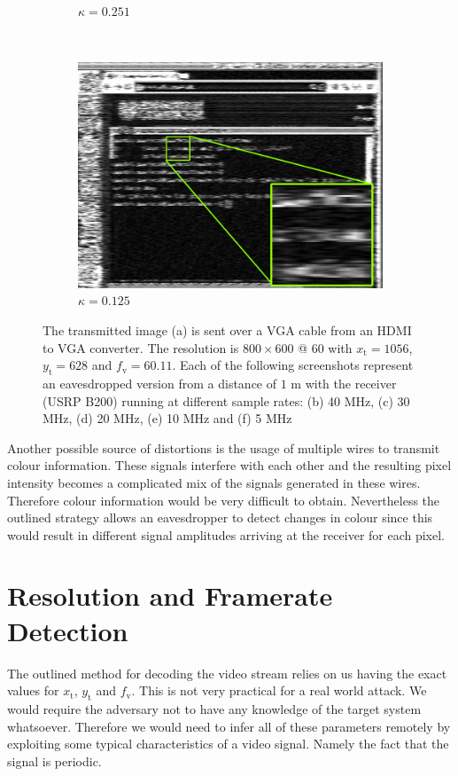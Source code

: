\documentclass[a4paper,12pt,twoside,openright]{report}
\begin{document}
\begin{figure}[p!]
\begin{subfigure}[b]{0.45\textwidth}
  \caption{$\kappa = 0.251$}
\end{subfigure} ~
\begin{subfigure}[b]{0.45\textwidth}
  \includegraphics[width=\textwidth]{sr_5MHz_at_190MHz}
  \caption{$\kappa = 0.125$}
\end{subfigure}
\caption{The transmitted image (a) is sent over a VGA cable from an HDMI to VGA converter. The resolution is $800 \times 600 $ @ $ 60$ with $x_\text{t} = 1056$, $y_\text{t} = 628$ and $f_\text{v} = 60.11$. Each of the following screenshots represent an eavesdropped version from a distance of $1$ m with the receiver (USRP B200) running at different sample rates: (b) 40 MHz, (c) 30 MHz, (d) 20 MHz, (e) 10 MHz and (f) 5 MHz}
\label{fig:samplerates}
\end{figure}

Another possible source of distortions is the usage of multiple wires to transmit colour information. These signals interfere with each other and the resulting pixel intensity becomes a complicated mix of the signals generated in these wires. Therefore colour information would be very difficult to obtain. Nevertheless the outlined strategy allows an eavesdropper to detect changes in colour since this would result in different signal amplitudes arriving at the receiver for each pixel.

\section{Resolution and Framerate Detection}

The outlined method for decoding the video stream relies on us having the exact values for $x_\text{t}$, $y_\text{t}$ and $f_\text{v}$. This is not very practical for a real world attack. We would require the adversary not to have any knowledge of the target system whatsoever. Therefore we would need to infer all of these parameters remotely by exploiting some typical characteristics of a video signal. Namely the fact that the signal is periodic.
\end{document}
